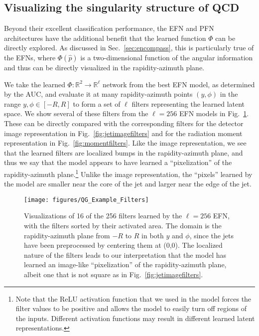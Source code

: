 \documentclass[letterpaper,11pt]{article}
\DeclareRobustCommand{\Sec}[1]{Sec.~\ref{#1}}
\DeclareRobustCommand{\Fig}[1]{Fig.~\ref{#1}}
\begin{document}
\afterpage{\clearpage}


\subsection{Visualizing the singularity structure of QCD}
\label{sec:visualizeqcd}

Beyond their excellent classification performance, the EFN and PFN architectures have the additional benefit that the learned function $\Phi$ can be directly explored.
%
As discussed in \Sec{sec:encompass}, this is particularly true of the EFNs, where $\Phi(\hat p)$ is a two-dimensional function of the angular information and thus can be directly visualized in the rapidity-azimuth plane.


We take the learned $\Phi: \mathbb R^2 \to \mathbb R^\ell$ network from the best EFN model, as determined by the AUC, and evaluate it at many rapidity-azimuth points $(y,\phi)$ in the range $y,\phi\in[-R,R]$ to form a set of $\ell$ filters representing the learned latent space.
%
We show several of these filters from the $\ell=256$ EFN models in \Fig{fig:qgfilters}.
%
These can be directly compared with the corresponding filters for the detector image representation in \Fig{fig:jetimagefilters} and for the radiation moment representation in \Fig{fig:momentfilters}.
%
Like the image representation, we see that the learned filters are localized bumps in the rapidity-azimuth plane, and thus we say that the model appears to have learned a ``pixelization'' of the rapidity-azimuth plane.\footnote{Note that the ReLU activation function that we used in the model forces the filter values to be positive and allows the model to easily turn off regions of the inputs. Different activation functions may result in different learned latent representations.}
%
Unlike the image representation, the ``pixels'' learned by the model are smaller near the core of the jet and larger near the edge of the jet.


\begin{figure}[t]
\centering
\texttt{[image: figures/QG\_Example\_Filters]}
\caption{Visualizations of 16 of the 256 filters learned by the $\ell=256$ EFN, with the filters sorted by their activated area.
%
The domain is the rapidity-azimuth plane from $-R$ to $R$ in both $y$ and $\phi$, since the jets have been preprocessed by centering them at (0,0).
%
The localized nature of the filters leads to our interpretation that the model has learned an image-like ``pixelization'' of the rapidity-azimuth plane, albeit one that is not square as in \Fig{fig:jetimagefilters}.
}
\label{fig:qgfilters}
\end{figure}
\end{document}
